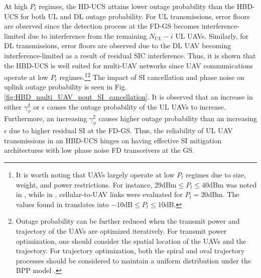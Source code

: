 At high $P_t$ regimes, the HD-UCS attains lower outage probability than the HBD-UCS for both UL and DL outage probability. For UL transmissions, error floors are observed since the detection process at the FD-GS becomes interference-limited due to interference from the remaining $N_{UL}-i$ UL UAVs. Similarly, for DL transmissions, error floors are observed due to the DL UAV becoming interference-limited as a result of residual SIC interference.  Thus, it is shown that the HBD-UCS is well suited for multi-UAV networks since UAV communications operate at low $P_t$ regimes.\footnote{It is worth noting that UAVs largely operate at low $P_t$ regimes due to size, weight, and power restrictions. For instance, $29\text{dBm} \leq P_t \leq 40\text{dBm}$ was noted in \cite{itu2011m2233}, while in \cite{zeng2018cellularconnecteduav}, cellular-to-UAV links were evaluated for $P_t = 20\text{dBm}$. The values found in \cite{itu2011m2233,zeng2018cellularconnecteduav} translates into $-10 \text{dB} \leq P_t \leq 10 \text{dB}$.}\footnote{Outage probability can be further reduced when the transmit power and trajectory of the UAVs are optimized iteratively. For transmit power optimization, one should consider the spatial location of the UAVs and the trajectory. For trajectory optimization, both the spiral and oval trajectory processes should be considered to maintain a uniform distribution under the BPP model \cite{enayati2019moving}.} The impact of SI cancellation and phase noise on uplink outage probability is seen in Fig. \ref{fig:HBD_multi_UAV_pout_SI_cancellation}. It is observed that an increase in either $\gamma_{\phi}^2$ or $\epsilon$ causes the outage probability of the UL UAVs to increase. Furthermore, an increasing $\gamma_{\phi}^2$ causes higher outage probability than an increasing $\epsilon$ due to higher residual SI at the FD-GS. Thus, the reliability of UL UAV transmissions in an HBD-UCS hinges on having effective SI mitigation architectures with low phase noise FD transceivers at the GS. 

